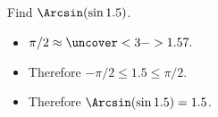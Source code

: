 \begin{frame}
\begin{example}
Find $\Arcsin (\sin 1.5)$.  
\begin{itemize}
\item<2->  \alert<2-3>{$\pi/2 \approx \uncover<3->{1.57.}$}
\item<4->  Therefore $-\pi/2 \leq 1.5\leq \pi/2$.  
\item<5->  Therefore $\Arcsin (\sin 1.5) = 1.5$.  
\end{itemize}
\end{example}
\end{frame}

